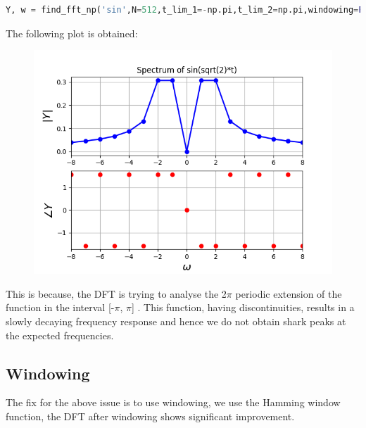 \documentclass[11pt, a4paper]{article}
\begin{document}
\begin{lstlisting}[language = Python]
Y, w = find_fft_np('sin',N=512,t_lim_1=-np.pi,t_lim_2=np.pi,windowing=False)
\end{lstlisting}

The following plot is obtained:
\begin{figure}[H]
     \centering
     \includegraphics[scale=0.8]{Figure_1.png}
\end{figure}

This is because, the DFT is trying to analyse the 2$\pi$ periodic extension
of the function in the interval [-$\pi$, $\pi$] . This function, having discontinuities,
results in a slowly decaying frequency response and hence we do not obtain
shark peaks at the expected frequencies.

\subsection*{Windowing}
The fix for the above issue is to use windowing, we use the Hamming window function, the DFT after windowing shows significant improvement.
\end{document}
